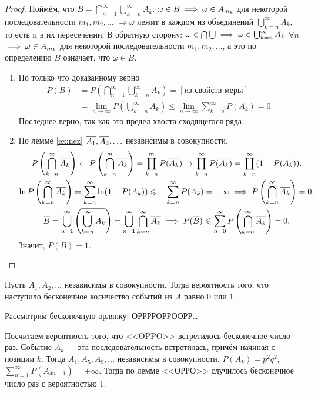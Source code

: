 \begin{proof}
     Поймём, что $B = \bigcap\limits_{n = 1}^\infty \bigcup_{k = n}^\infty A_k$. 
    $\omega \in B \implies \omega \in A_{m_k} $ для некоторой последовательности $m_1,m_2, \ldots$ $\Rightarrow \omega$ лежит в каждом из объединений
    $\bigcup_{k = n}^\infty A_k$, то есть и в их пересечении.
    В обратную сторону:  $\omega \in \bigcap\bigcup \implies \omega\in\bigcup_{k = n}^\infty A_k $ $\forall n$ $\implies \omega\in A_{m_k}$ для
    некоторой последовательности $m_1, m_2, \ldots$, а это по определению $B$ означает, что $\omega\in B$.
   \begin{enumerate}
       \item По только что доказанному верно
       \begin{align*}
           P(B) &= P\left(\bigcap_{n = 1}^\infty \bigcup_{k = n}^\infty A_k\right) = [\text{из свойств меры}]
           \\ &= \underset{n\to \infty}{\lim}
        P\left(\bigcup_{k = n}^\infty A_k\right) \le \underset{n\to\infty}{\lim} \sum_{k = n}^\infty P(A_k) = 0.
       \end{align*}
       Последнее верно, так как это предел хвоста сходящегося ряда.
       \item По лемме \ref{ex:nez} $\overline{A_1}, \overline{A_2}, \ldots$ независимы в совокупности.
       \begin{gather*}
           P\left(\bigcap_{k = n}^\infty \overline{A_k}\right) \leftarrow P\left(\bigcap_{k = n}^m \overline{A_k}\right) = \prod_{k = n}^m P(\overline{A_k}) \rightarrow  \prod_{k = n}^\infty
        P(\overline{A_k}) =  \prod_{k = n}^\infty (1 - P(A_k)).\\
         \ln P\left(\bigcap_{k = n}^\infty \overline{A_k}\right) = \sum_{k = n}^\infty \ln (1 - P(A_k)) \leqslant - \sum_{k = n}^\infty P(A_k)  = -\infty \implies
        P\left(\bigcap_{k = n}^\infty \overline{A_k}\right) = 0.\\
        \overline{B} = \bigcup_{n = 1}^\infty\left(\overline{\bigcup_{k = n}^\infty A_k}\right) = \bigcup_{n = 1}^\infty\bigcap_{k = n}^\infty \overline{A_k}
        \implies P(\overline{B}) \leqslant \sum_{n = 0}^\infty P\left(\bigcap_{k = n}^\infty \overline{A_k}\right) = 0.
       \end{gather*}
        Значит, $P(B) = 1$. \qedhere
   \end{enumerate}
\end{proof}

\begin{corollary} Пусть $A_1, A_2, \ldots$ независимы в совокупности. Тогда вероятность того, что наступило бесконечное количество событий из $A$ равно $0$ или $1$.
\end{corollary}

\begin{example}
    Рассмотрим бесконечную орлянку: ОРРРРОРРООРР\ldots

    Посчитаем вероятность того, что <<OPPO>> встретилось бесконечное число раз. Событие $A_k$ --- эта последовательность встретилась, причём начиная с позиции $k$. Тогда $A_1, A_5, A_9, \ldots$ независимы в совокупности.
    $P(A_k) = p^2q^2$, $\sum_{n = 1}^\infty P(A_{4n+1}) = +\infty$. Тогда по лемме <<ОРРО>> случилось бесконечное число раз с вероятностью 1.
\end{example}
